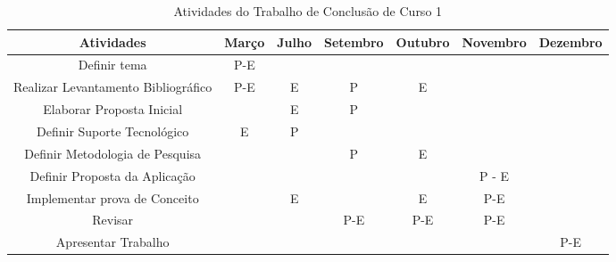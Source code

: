 \begin{table}[h]
	\centering
	\caption{Atividades do Trabalho de Conclusão de Curso 1}
	\label{tab04}
	
	\begin{tabular}{ccccccc}
		\toprule
		\textbf{Atividades} & \textbf{Março} & 
		\textbf{Julho}  & \textbf{Setembro}& \textbf{Outubro} & \textbf{Novembro} & \textbf{Dezembro}\\
		\midrule
		Definir tema & P-E & & &  &\\
		\midrule
		\begin{minipage} [t] {0.2\textwidth} \centering Realizar Levantamento Bibliográfico \end{minipage} & P-E & E & P & E & & \\
		\midrule
		\begin{minipage} [t] {0.2\textwidth} \centering Elaborar Proposta Inicial\end{minipage} &  & E & P &  &  &\\
		\midrule
		\begin{minipage} [t] {0.2\textwidth} \centering Definir Suporte Tecnológico \end{minipage} & E & P & &  & &\\
		\midrule
		\begin{minipage} [t] {0.2\textwidth} \centering Definir Metodologia de Pesquisa\end{minipage} &  &  & P & E & &\\
		\midrule
		\begin{minipage} [t] {0.2\textwidth} \centering Definir Proposta da Aplicação \end{minipage} &  & & &  & P - E &\\
		\midrule
		\begin{minipage} [t] {0.2\textwidth} \centering Implementar prova de Conceito \end{minipage} &  & E & & E & P-E &\\
		\midrule
		\begin{minipage} [t] {0.2\textwidth} \centering Revisar \end{minipage} &  & & P-E & P-E & P-E &\\
		\midrule
		\begin{minipage} [t] {0.2\textwidth} \centering Apresentar Trabalho \end{minipage} &  &  & &  & & P-E\\
		\bottomrule
	\end{tabular}
\end{table}


